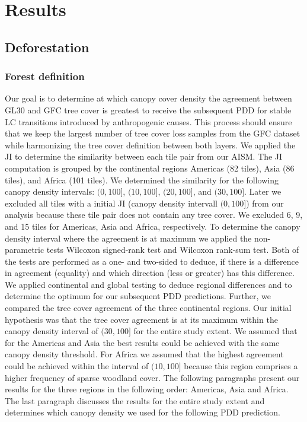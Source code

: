 \chapter{Results}
\label{ch:results}

	\section{Deforestation}
	\label{sec:results_deforestation}

		\subsection{Forest definition}
		\label{subsec:results_forest_definition}
			Our goal is to determine at which canopy cover density the agreement between \ac{GL30} and \ac{GFC} tree cover is greatest to receive the subsequent \ac{PDD} for stable \ac{LC} transitions introduced by anthropogenic causes. This process should ensure that we keep the largest number of tree cover loss samples from the \ac{GFC} dataset while harmonizing the tree cover definition between both layers. We applied the \ac{JI} to determine the similarity between each tile pair from our \ac{AISM}. The \ac{JI} computation is grouped by the continental regions Americas (82 tiles), Asia (86 tiles), and Africa (101 tiles). We determined the similarity for the following canopy density intervals: $(0, 100]$, $(10, 100]$, $(20, 100]$, and $(30, 100]$. Later we excluded all tiles with a initial \ac{JI} (canopy density intervall $(0,100]$) from our analysis because these tile pair does not contain any tree cover. We excluded 6, 9, and 15 tiles for Americas, Asia and Africa, respectively. To determine the canopy density interval where the agreement is at maximum we applied the non-parametric tests Wilcoxon signed-rank test and Wilcoxon rank-sum test. Both of the tests are performed as a one- and two-sided to deduce, if there is a difference in agreement (equality) and which direction (less or greater) has this difference. We applied continental and global testing to deduce regional differences and to determine the optimum for our subsequent \ac{PDD} predictions. Further, we compared the tree cover agreement of the three continental regions. Our initial hypothesis was that the tree cover agreement is at its maximum within the canopy density interval of $(30,100]$ for the entire study extent. We assumed that for the Americas and Asia the best results could be achieved with the same canopy density threshold. For Africa we assumed that the highest agreement could be achieved within the interval of $(10,100]$ because this region comprises a higher frequency of sparse woodland cover. The following paragraphs present our results for the three regions in the following order: Americas, Asia and Africa. The last paragraph discusses the results for the entire study extent and determines which canopy density we used for the following \ac{PDD} prediction.


